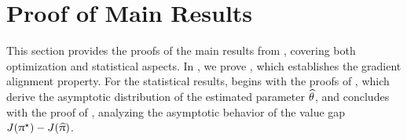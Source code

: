 


%	
%	


	\section{Proof of Main Results \yaqidone}
    \label{app:proof:main}

        
    
		This section provides the proofs of the main results from , covering both optimization and statistical aspects.
		In , we prove , which establishes the gradient alignment property. For the statistical results,  begins with the proofs of , which derive the asymptotic distribution of the estimated parameter $\widehat{\theta}$, and concludes with the proof of , analyzing the asymptotic behavior of the value gap~\mbox{$J(\uppi^{\star}) - J(\widehat{\uppi})$}.
	

